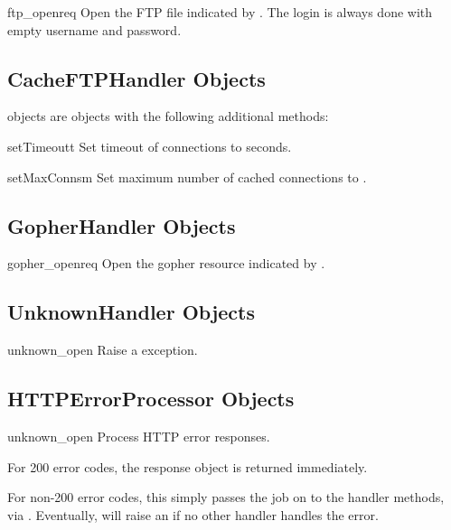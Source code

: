 \begin{methoddesc}[FTPHandler]{ftp_open}{req}
Open the FTP file indicated by .
The login is always done with empty username and password.
\end{methoddesc}


\subsection{CacheFTPHandler Objects \label{cacheftp-handler-objects}}

 objects are  objects with
the following additional methods:

\begin{methoddesc}[CacheFTPHandler]{setTimeout}{t}
Set timeout of connections to  seconds.
\end{methoddesc}

\begin{methoddesc}[CacheFTPHandler]{setMaxConns}{m}
Set maximum number of cached connections to .
\end{methoddesc}


\subsection{GopherHandler Objects \label{gopher-handler}}

\begin{methoddesc}[GopherHandler]{gopher_open}{req}
Open the gopher resource indicated by .
\end{methoddesc}


\subsection{UnknownHandler Objects \label{unknown-handler-objects}}

\begin{methoddesc}[UnknownHandler]{unknown_open}{}
Raise a  exception.
\end{methoddesc}


\subsection{HTTPErrorProcessor Objects \label{http-error-processor-objects}}

\begin{methoddesc}[HTTPErrorProcessor]{unknown_open}{}
Process HTTP error responses.

For 200 error codes, the response object is returned immediately.

For non-200 error codes, this simply passes the job on to the
 handler methods, via
.  Eventually,
 will raise an
 if no other handler handles the error.
\end{methoddesc}


